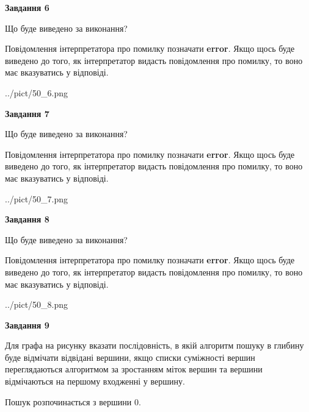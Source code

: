 \documentclass[12pt, ukrainian]{article}
\begin{document}
{\begin {large}
{\begin {center}\textbf{Завдання 6}\end {center}}\par
Що буде виведено за виконання?

Повідомлення інтерпретатора про помилку позначати \textbf{error}.
Якщо щось буде виведено до того, як інтерпретатор видасть повідомлення про помилку, 
то воно має вказуватись у відповіді. \par


\begin{center}
	{../pict/50_6.png}
\end{center}
\newpage

{\begin {center}\textbf{Завдання 7}\end {center}}\par
Що буде виведено за виконання?

Повідомлення інтерпретатора про помилку позначати \textbf{error}.
Якщо щось буде виведено до того, як інтерпретатор видасть повідомлення про помилку, 
то воно має вказуватись у відповіді. \par


\begin{center}
	{../pict/50_7.png}
\end{center}
\newpage

{\begin {center}\textbf{Завдання 8}\end {center}}\par
Що буде виведено за виконання?

Повідомлення інтерпретатора про помилку позначати \textbf{error}.
Якщо щось буде виведено до того, як інтерпретатор видасть повідомлення про помилку, 
то воно має вказуватись у відповіді. \par


\begin{center}
	{../pict/50_8.png}
\end{center}
\newpage

{\begin {center}\textbf{Завдання 9}\end {center}}\par
Для графа на рисунку вказати послідовність, в якій алгоритм пошуку в глибину буде відмічати відвідані вершини, якщо списки суміжності вершин переглядаються алгоритмом за зростанням міток вершин та вершини відмічаються на першому вход\-женні у вершину.\par
Пошук розпочинається з вершини 0.\par


\end{large}}
\end{document}
